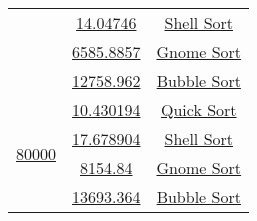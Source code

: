 \begin{lrbox}{\sorttime}
\begin{tabular}{|c|c|c|}
\cline{2-3}
 & {\href{T1.57.1}{14.04746}} & {\href{T1.57.2}{Shell Sort}}\\
\cline{2-3}
 & {\href{T1.59.1}{6585.8857}} & {\href{T1.59.2}{Gnome Sort}}\\
\cline{2-3}
 & {\href{T1.58.1}{12758.962}} & {\href{T1.58.2}{Bubble Sort}}\\
\hline
 \multirow{4}{*}{\href{T1.60.0}{80000}} & {\href{T1.60.1}{10.430194}} & {\href{T1.60.2}{Quick Sort}}\\
\cline{2-3}
 & {\href{T1.61.1}{17.678904}} & {\href{T1.61.2}{Shell Sort}}\\
\cline{2-3}
 & {\href{T1.63.1}{8154.84}} & {\href{T1.63.2}{Gnome Sort}}\\
\cline{2-3}
 & {\href{T1.62.1}{13693.364}} & {\href{T1.62.2}{Bubble Sort}}\\

\hline
\end{tabular}
\end{lrbox}

